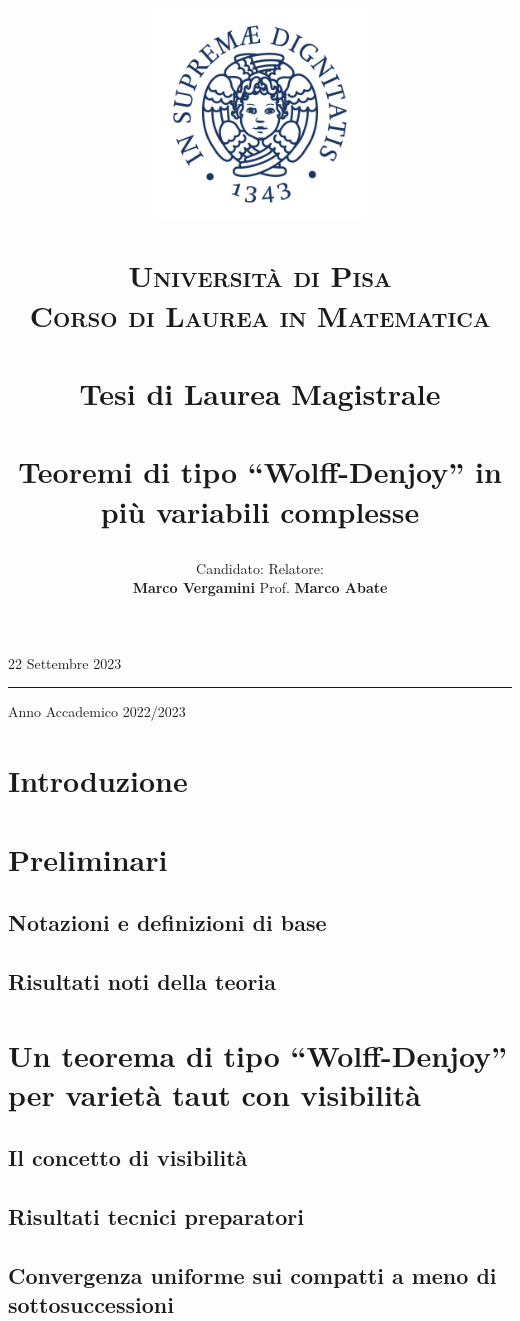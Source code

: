 \documentclass{article}
\title{\begin{figure}[t!]
    \centering
    \includegraphics[trim=0 55 0 60, clip, width=0.5\textwidth]{Stemma_unipi.jpg}
  \end{figure}
  \vspace{-17.5mm}
  \textsc{\Large Università di Pisa}\\
  \textsc{\large Corso di Laurea in Matematica}\\
  \, \\
  {\large Tesi di Laurea Magistrale}\\
  \, \\
  Teoremi di tipo ``Wolff-Denjoy'' in più variabili complesse}
\author{Candidato:  \hspace{200px} Relatore:\\
  \textbf{Marco Vergamini} \hfill Prof. \textbf{Marco Abate}}
\date{}
\begin{document}
  \maketitle
  \vspace*{\fill}
  \begin{center}
    22 Settembre 2023
    \par\noindent\rule{\textwidth}{0.5pt}
    \Large Anno Accademico 2022/2023
  \end{center}
  \newpage
  \tableofcontents
  \newpage


\section*{Introduzione}


\newpage

\section{Preliminari} \label{Preliminari}
\subsection{Notazioni e definizioni di base}

\subsection{Risultati noti della teoria} \label{risnoti}


\newpage

\section{Un teorema di tipo ``Wolff-Denjoy'' per varietà taut con visibilità} \label{Un teorema di tipo ``Wolff-Denjoy'' per varietà taut con visibilità}
\subsection{Il concetto di visibilità}

\subsection{Risultati tecnici preparatori}

\subsection{Convergenza uniforme sui compatti a meno di sottosuccessioni}\label{convcpt}

\end{document}
